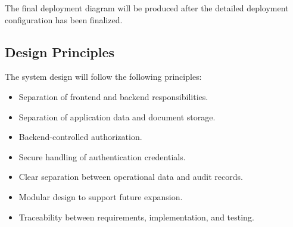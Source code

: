 The final deployment diagram will be produced after the detailed
deployment configuration has been finalized.


\subsection{Design Principles}

The system design will follow the following principles:

\begin{itemize}
    \item Separation of frontend and backend responsibilities.
    \item Separation of application data and document storage.
    \item Backend-controlled authorization.
    \item Secure handling of authentication credentials.
    \item Clear separation between operational data and audit records.
    \item Modular design to support future expansion.
    \item Traceability between requirements, implementation, and testing.
\end{itemize}